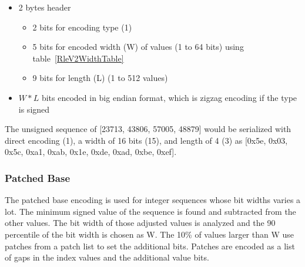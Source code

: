 \documentclass{article}
\begin{document}
\begin{itemize}
\item 2 bytes header
  \begin{itemize}
  \item 2 bits for encoding type (1)
  \item 5 bits for encoded width (W) of values (1 to 64 bits) using
    table~\ref{RleV2WidthTable}
  \item 9 bits for length (L) (1 to 512 values)
  \end{itemize}
\item $W * L$ bits encoded in big endian format, which is
  zigzag encoding if the type is signed
\end{itemize}

The unsigned sequence of [23713, 43806, 57005, 48879] would be
serialized with direct encoding (1), a width of 16 bits (15), and
length of 4 (3) as [0x5e, 0x03, 0x5c, 0xa1, 0xab, 0x1e, 0xde, 0xad,
  0xbe, 0xef].

\subsubsection{Patched Base}

The patched base encoding is used for integer sequences whose bit
widths varies a lot. The minimum signed value of the sequence is found
and subtracted from the other values. The bit width of those adjusted
values is analyzed and the 90 percentile of the bit width is chosen
as W.  The 10\% of values larger than W use patches from a patch list
to set the additional bits. Patches are encoded as a list of gaps in
the index values and the additional value bits.
\end{document}
